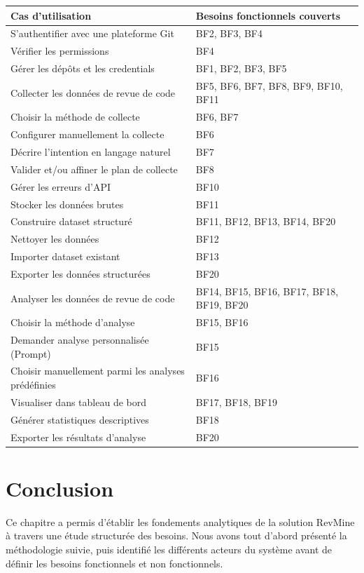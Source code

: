 \begin{tabularx}{\textwidth}{|l|X|}
\hline

\textbf{Cas d’utilisation} & \textbf{Besoins fonctionnels couverts} \\ \hline

S’authentifier avec une plateforme Git & BF2, BF3, BF4 \\ \hline
Vérifier les permissions & BF4 \\ \hline
Gérer les dépôts et les credentials & BF1, BF2, BF3, BF5 \\ \hline
Collecter les données de revue de code & BF5, BF6, BF7, BF8, BF9, BF10, BF11 \\ \hline
Choisir la méthode de collecte & BF6, BF7 \\ \hline
Configurer manuellement la collecte & BF6 \\ \hline
Décrire l’intention en langage naturel & BF7 \\ \hline
Valider et/ou affiner le plan de collecte & BF8 \\ \hline
Gérer les erreurs d’API & BF10 \\ \hline
Stocker les données brutes & BF11 \\ \hline
Construire dataset structuré & BF11, BF12, BF13, BF14, BF20 \\ \hline
Nettoyer les données & BF12 \\ \hline
Importer dataset existant & BF13 \\ \hline
Exporter les données structurées & BF20 \\ \hline
Analyser les données de revue de code & BF14, BF15, BF16, BF17, BF18, BF19, BF20 \\ \hline
Choisir la méthode d’analyse & BF15, BF16 \\ \hline
Demander analyse personnalisée (Prompt) & BF15 \\ \hline
Choisir manuellement parmi les analyses prédéfinies & BF16 \\ \hline
Visualiser dans tableau de bord & BF17, BF18, BF19 \\ \hline
Générer statistiques descriptives & BF18 \\ \hline
Exporter les résultats d’analyse & BF20 \\ \hline

\end{tabularx}




\section{Conclusion}
Ce chapitre a permis d’établir les fondements analytiques de la solution RevMine à travers une étude structurée des besoins. Nous avons tout d’abord présenté la méthodologie suivie, puis identifié les différents acteurs du système avant de définir les besoins fonctionnels et non fonctionnels.

